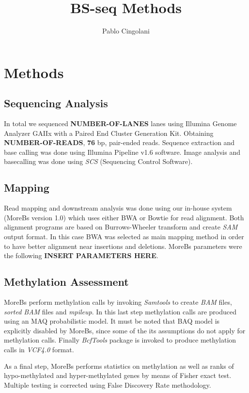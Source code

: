 \documentclass[10pt,a4paper]{article}
\begin{document}
\title{BS-seq Methods}
\author{Pablo Cingolani}
\date{}
\maketitle

\section{Methods}

\subsection{Sequencing Analysis}
In total we sequenced \textbf{NUMBER-OF-LANES} lanes using Illumina Genome Analyzer GAIIx with a Paired End Cluster Generation Kit. Obtaining \textbf{NUMBER-OF-READS}, \textbf{76} bp, pair-ended reads. Sequence extraction and base calling was done using Illumina Pipeline v1.6 software. Image analysis and basecalling was done using \textit{SCS} (Sequencing Control Software).

\subsection{Mapping}
Read mapping and downstream analysis was done using our in-house system (MoreBs version 1.0) which uses either BWA\cite{li2010fast}\cite{li2010fastlong} or Bowtie\cite{langmead2009ultrafast} for read alignment. Both alignment programs are based on Burrows-Wheeler transform and create \textit{SAM}\cite{li2009sequence} output format. In this case BWA was selected as main mapping method in order to have better alignment near insertions and deletions. MoreBs parameters were the following \textbf{INSERT PARAMETERS HERE}.

\subsection{Methylation Assessment}
MoreBs perform methylation calls by invoking \textit{Samtools} to create \textit{BAM} files, \textit{sorted BAM} files and \textit{mpileup}. In this last step methylation calls are produced using an MAQ\cite{li2008mapping} probabilistic model. It must be noted that BAQ\cite{li2010baq} model is explicitly disabled by MoreBs, since some of the its assumptions do not apply for methylation calls. Finally \textit{BcfTools} package is invoked to produce methylation calls in \textit{VCF4.0}\cite{vcf4broad} format.

As a final step, MoreBs performs statistics on methylation as well as ranks of hypo-methylated and hyper-methylated genes by means of Fisher exact test. Multiple testing is corrected using False Discovery Rate methodology\cite{benjamini1995controlling}.
\end{document}
